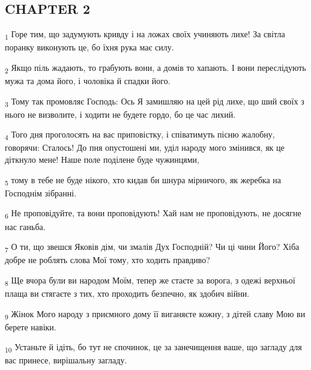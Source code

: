 \subsection{CHAPTER 2}
\begin{tcolorbox}
\textsubscript{1} Горе тим, що задумують кривду і на ложах своїх учиняють лихе! За світла поранку виконують це, бо їхня рука має силу.
\end{tcolorbox}
\begin{tcolorbox}
\textsubscript{2} Якщо піль жадають, то грабують вони, а домів то хапають. І вони переслідують мужа та дома його, і чоловіка й спадки його.
\end{tcolorbox}
\begin{tcolorbox}
\textsubscript{3} Тому так промовляє Господь: Ось Я замишляю на цей рід лихе, що ший своїх з нього не визволите, і ходити не будете гордо, бо це час лихий.
\end{tcolorbox}
\begin{tcolorbox}
\textsubscript{4} Того дня проголосять на вас приповістку, і співатимуть пісню жалобну, говорячи: Сталось! До пня опустошені ми, уділ народу мого змінився, як це діткнуло мене! Наше поле поділене буде чужинцями,
\end{tcolorbox}
\begin{tcolorbox}
\textsubscript{5} тому в тебе не буде нікого, хто кидав би шнура мірничого, як жеребка на Господнім зібранні.
\end{tcolorbox}
\begin{tcolorbox}
\textsubscript{6} Не проповідуйте, та вони проповідують! Хай нам не проповідують, не досягне нас ганьба.
\end{tcolorbox}
\begin{tcolorbox}
\textsubscript{7} О ти, що звешся Яковів дім, чи змалів Дух Господній? Чи ці чини Його? Хіба добре не роблять слова Мої тому, хто ходить правдиво?
\end{tcolorbox}
\begin{tcolorbox}
\textsubscript{8} Ще вчора були ви народом Моїм, тепер же стаєте за ворога, з одежі верхньої плаща ви стягаєте з тих, хто проходить безпечно, як здобич війни.
\end{tcolorbox}
\begin{tcolorbox}
\textsubscript{9} Жінок Мого народу з приємного дому її виганяєте кожну, з дітей славу Мою ви берете навіки.
\end{tcolorbox}
\begin{tcolorbox}
\textsubscript{10} Устаньте й ідіть, бо тут не спочинок, це за занечищення ваше, що загладу для вас принесе, вирішальну загладу.
\end{tcolorbox}
